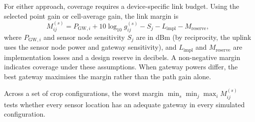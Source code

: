 For either approach, coverage requires a device-specific link budget. Using the selected point gain or cell-average gain, the link margin is
 \begin{equation}
  M_{ij}^{(s)}=P_{\mathrm{GW},i}+10\log_{10}g_{ij}^{(s)}
        -S_j-L_{\mathrm{impl}}-M_{\mathrm{reserve}},
  \label{eq:margin}
 \end{equation}
where $P_{\mathrm{GW},i}$ and sensor node sensitivity $S_j$ are in dBm (by reciprocity, the uplink uses the sensor node power and gateway sensitivity), and $L_{\mathrm{impl}}$ and $M_{\mathrm{reserve}}$ are implementation losses and a design reserve in decibels. A non-negative margin indicates coverage under these assumptions. When gateway powers differ, the best gateway maximises the margin rather than the path gain alone.

Across a set of crop configurations, the worst margin $\min_s\min_j\max_i M_{ij}^{(s)}$ tests whether every sensor location has an adequate gateway in every simulated configuration.


